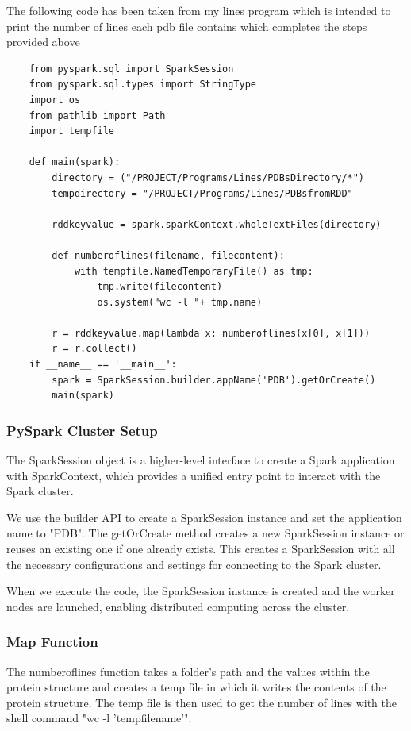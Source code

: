 \documentclass[]{final_report}
\begin{document}
The following code has been taken from my lines program which is intended to print the number of lines each pdb file contains which completes the steps provided above

\begin{lstlisting}
    from pyspark.sql import SparkSession
    from pyspark.sql.types import StringType
    import os
    from pathlib import Path
    import tempfile

    def main(spark):
        directory = ("/PROJECT/Programs/Lines/PDBsDirectory/*")
        tempdirectory = "/PROJECT/Programs/Lines/PDBsfromRDD"

        rddkeyvalue = spark.sparkContext.wholeTextFiles(directory)

        def numberoflines(filename, filecontent):
            with tempfile.NamedTemporaryFile() as tmp:
                tmp.write(filecontent)
                os.system("wc -l "+ tmp.name)

        r = rddkeyvalue.map(lambda x: numberoflines(x[0], x[1]))
        r = r.collect()
    if __name__ == '__main__':
        spark = SparkSession.builder.appName('PDB').getOrCreate()
        main(spark)

\end{lstlisting}

\clearpage

\subsubsection{PySpark Cluster Setup}

The SparkSession object is a higher-level interface to create a Spark application with SparkContext, which provides a unified entry point to interact with the Spark cluster.

We use the builder API to create a SparkSession instance and set the application name to "PDB". The getOrCreate method creates a new SparkSession instance or reuses an existing one if one already exists. This creates a SparkSession with all the necessary configurations and settings for connecting to the Spark cluster.

When we execute the code, the SparkSession instance is created and the worker nodes are launched, enabling distributed computing across the cluster.

\subsubsection{Map Function}
The numberoflines function takes a folder's path and the values within the protein structure and creates a temp file in which it writes the contents of the protein structure. The temp file is then used to get the number of lines with the shell command "wc -l 'tempfilename'".
\end{document}
